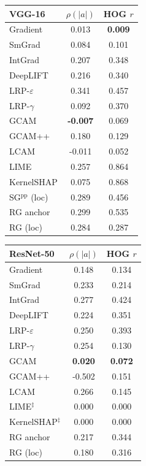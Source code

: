 \begin{tabular}[t]{@{}lcc@{}}
\toprule
\textbf{VGG-16} & $\rho(|a|)$ & HOG $r$ \\
\midrule
Gradient & 0.013 & \textbf{0.009} \\
SmGrad & 0.084 & 0.101 \\
IntGrad & 0.207 & 0.348 \\
DeepLIFT & 0.216 & 0.340 \\
LRP-$\varepsilon$ & 0.341 & 0.457 \\
LRP-$\gamma$ & 0.092 & 0.370 \\
GCAM & \textbf{-0.007} & 0.069 \\
GCAM++ & 0.180 & 0.129 \\
LCAM & -0.011 & 0.052 \\
LIME & 0.257 & 0.864 \\
KernelSHAP & 0.075 & 0.868 \\
SG$^{\mathrm{pp}}$ (loc) & 0.289 & 0.456 \\
RG anchor & 0.299 & 0.535 \\
RG (loc) & 0.284 & 0.287 \\
\bottomrule
\end{tabular}%
\hfill
\begin{tabular}[t]{@{}lcc@{}}
\toprule
\textbf{ResNet-50} & $\rho(|a|)$ & HOG $r$ \\
\midrule
Gradient & 0.148 & 0.134 \\
SmGrad & 0.233 & 0.214 \\
IntGrad & 0.277 & 0.424 \\
DeepLIFT & 0.224 & 0.351 \\
LRP-$\varepsilon$ & 0.250 & 0.393 \\
LRP-$\gamma$ & 0.254 & 0.130 \\
GCAM & \textbf{0.020} & \textbf{0.072} \\
GCAM++ & -0.502 & 0.151 \\
LCAM & 0.266 & 0.145 \\
LIME$^{\ddagger}$ & 0.000 & 0.000 \\
KernelSHAP$^{\ddagger}$ & 0.000 & 0.000 \\
RG anchor & 0.217 & 0.344 \\
RG (loc) & 0.180 & 0.316 \\
\bottomrule
\end{tabular}%
\hfill
